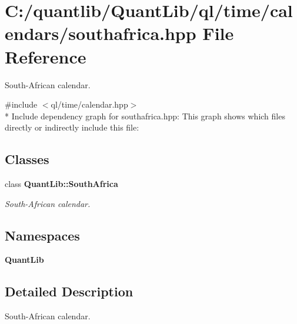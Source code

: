 \section{C\+:/quantlib/\+Quant\+Lib/ql/time/calendars/southafrica.hpp File Reference}
\label{southafrica_8hpp}


South-\/\+African calendar.  


{\ttfamily \#include $<$ql/time/calendar.\+hpp$>$}\\*
Include dependency graph for southafrica.\+hpp\+:
This graph shows which files directly or indirectly include this file\+:
\subsection*{Classes}
\begin{DoxyCompactItemize}
\item 
class {\bf Quant\+Lib\+::\+South\+Africa}
\begin{DoxyCompactList}\small\item\em South-\/\+African calendar. \end{DoxyCompactList}\end{DoxyCompactItemize}
\subsection*{Namespaces}
\begin{DoxyCompactItemize}
\item 
 {\bf Quant\+Lib}
\end{DoxyCompactItemize}


\subsection{Detailed Description}
South-\/\+African calendar. 

